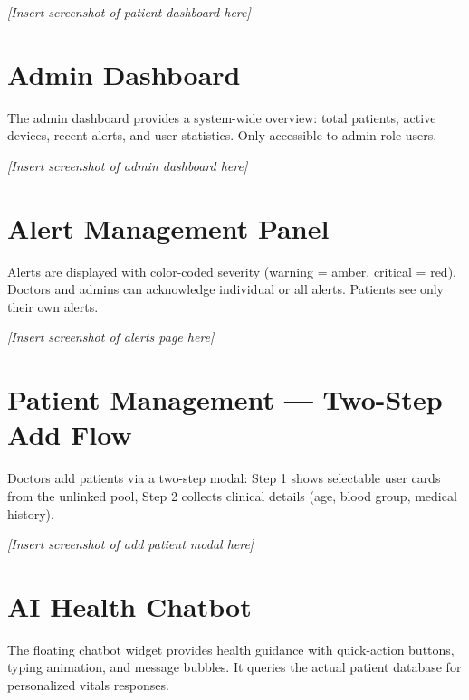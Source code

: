 \noindent\textit{[Insert screenshot of patient dashboard here]}

\section{Admin Dashboard}
The admin dashboard provides a system-wide overview: total patients, active devices, recent alerts, and user statistics. Only accessible to admin-role users.


\noindent\textit{[Insert screenshot of admin dashboard here]}

\section{Alert Management Panel}
Alerts are displayed with color-coded severity (warning = amber, critical = red). Doctors and admins can acknowledge individual or all alerts. Patients see only their own alerts.


\noindent\textit{[Insert screenshot of alerts page here]}

\section{Patient Management --- Two-Step Add Flow}
Doctors add patients via a two-step modal: Step 1 shows selectable user cards from the unlinked pool, Step 2 collects clinical details (age, blood group, medical history).


\noindent\textit{[Insert screenshot of add patient modal here]}

\section{AI Health Chatbot}
The floating chatbot widget provides health guidance with quick-action buttons, typing animation, and message bubbles. It queries the actual patient database for personalized vitals responses.

